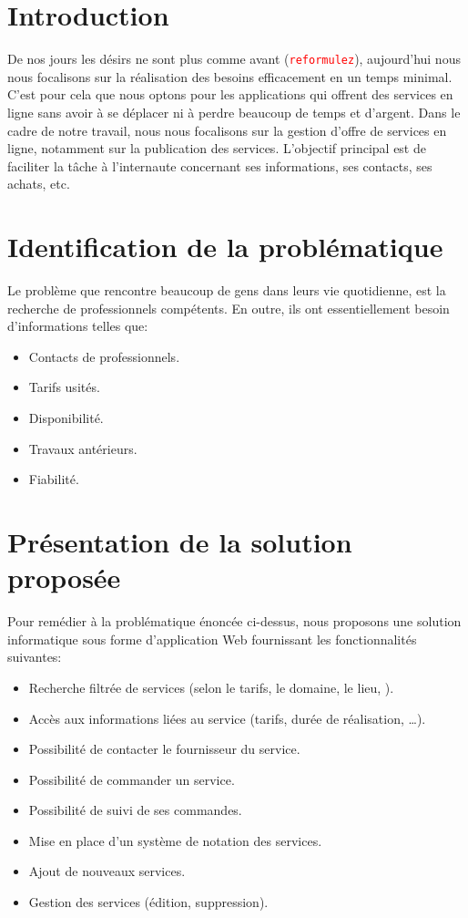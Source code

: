 \documentclass[french]{report}
\newcommand\rmq[1]{\textcolor{red}{\tt #1}}
\begin{document}
\section{Introduction}
De nos jours les désirs ne sont plus comme avant (\rmq{reformulez}), aujourd'hui
nous nous focalisons sur la réalisation des besoins efficacement en un temps
minimal. C'est pour cela que nous optons pour les applications qui offrent des
services en ligne sans avoir à se déplacer ni à perdre beaucoup de temps et
d'argent.  Dans le cadre de notre travail, nous nous focalisons sur la gestion
d'offre de services en ligne, notamment sur la publication des services.
L'objectif principal est de faciliter la tâche à l'internaute concernant ses
informations, ses contacts, ses achats,  etc.

\section{Identification de la problématique}

Le problème que rencontre beaucoup de gens dans leurs vie quotidienne, est la
recherche de professionnels compétents. En outre, ils ont essentiellement besoin
d'informations telles que:

\begin{itemize}
    \item Contacts de professionnels.
    \item Tarifs usités.
    \item Disponibilité.
    \item Travaux antérieurs.
    \item Fiabilité. 
\end{itemize}

\section{Présentation de la solution proposée}

Pour remédier à la problématique énoncée ci-dessus, nous proposons une solution
informatique sous forme d'application Web fournissant les fonctionnalités
suivantes:

\begin{itemize}
    \item Recherche filtrée de services (selon le tarifs, le domaine, le lieu,
        \ldos).
    \item Accès aux informations liées au service (tarifs, durée de réalisation,
        \ldots).
    \item Possibilité de contacter le fournisseur du service.
    \item Possibilité de commander un service.
    \item Possibilité de suivi de ses commandes.
    \item Mise en place d'un système de notation des services.
    \item Ajout de nouveaux services.
    \item Gestion des services (édition, suppression).
\end{itemize}
\end{document}
